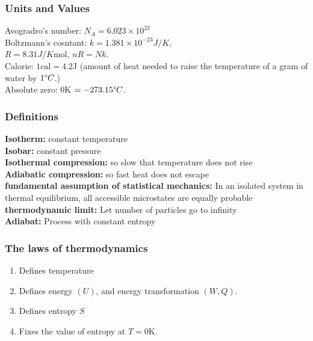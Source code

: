 \documentclass[a4paper, norsk, 8pt]{article}
\begin{document}
\tiny
\begin{multicols*}{3}
\subsubsection*{\scriptsize Units and Values}
Avogradro's number: $N_A=6.023\times 10^{23}$ \\
Boltzmann's cosntant: $k=1.381\times 10^{-23}J/K$,\\ $R = 8.31J/K\text{mol}$, $nR=Nk$.\\
Calorie: $1\text{cal} = 4.2$J (amount of heat needed to raise the temperature of a gram of water by $1\degree C$.)\\
Absolute zero: $0$K $=-273.15\degree C$.


\subsubsection*{\scriptsize Definitions}
\textbf{Isotherm:} constant temperature \\
\textbf{Isobar:} constant pressure \\
\textbf{Isothermal compression:} so slow that temperature does not rise \\
\textbf{Adiabatic compression:} so fast heat does not escape \\
\textbf{fundamental assumption of statistical mechanics:} In an isolated system in thermal equilibrium, all accessible microstates are equally probable\\
\textbf{thermodynamic limit:} Let number of particles go to infinity\\
\textbf{Adiabat:} Process with constant entropy\\

\subsubsection*{\scriptsize The laws of thermodynamics}
\begin{enumerate}
  \setcounter{enumi}{0}
  \item Defines temperature
  \item Defines energy $(U)$, and energy transformation $(W, Q)$.
  \item Defines entropy $S$
  \item Fixes the value of entropy at $T=0$K.
\end{enumerate}



\end{multicols*}
\end{document}
